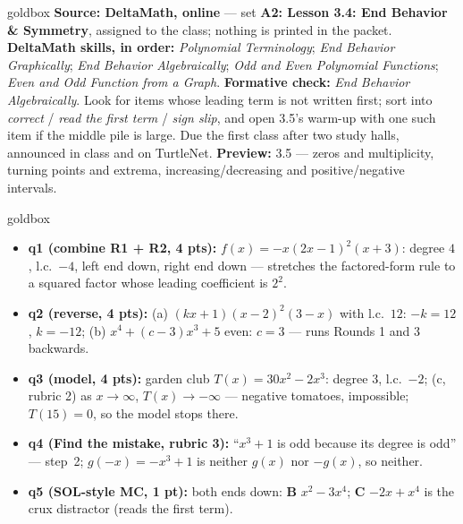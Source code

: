 \documentclass[10pt]{article}
\begin{document}
\boxguard
\begin{skillbox}{goldbox}
\textbf{Source: DeltaMath, online} --- set \textbf{A2: Lesson 3.4: End Behavior \& Symmetry},
assigned to the class; nothing is printed in the packet. \textbf{DeltaMath skills, in order:} \emph{Polynomial Terminology}; \emph{End Behavior Graphically}; \emph{End Behavior Algebraically}; \emph{Odd and Even Polynomial Functions}; \emph{Even and Odd Function from a Graph}. \textbf{Formative check:} \emph{End Behavior Algebraically}. Look for items whose leading term is not written first;
sort into \emph{correct} / \emph{read the first term} / \emph{sign slip}, and open 3.5's warm-up
with one such item if the middle pile is large. Due the first class after two study halls,
announced in class and on TurtleNet. \textbf{Preview:} 3.5 --- zeros and multiplicity, turning
points and extrema, increasing/decreasing and positive/negative intervals.
\end{skillbox}

\boxguard
\begin{skillbox}{goldbox}
\begin{itemize}[leftmargin=1.2em, nosep]
  \item \textbf{q1 (combine R1 + R2, 4 pts):} $f(x)=-x(2x-1)^2(x+3)$: degree $4$, l.c.\ $-4$,
        left end down, right end down --- stretches the factored-form rule to a squared factor
        whose leading coefficient is $2^2$.
  \item \textbf{q2 (reverse, 4 pts):} (a) $(kx+1)(x-2)^2(3-x)$ with l.c.\ $12$: $-k=12$,
        $k=-12$; (b) $x^4+(c-3)x^3+5$ even: $c=3$ --- runs Rounds 1 and 3 backwards.
  \item \textbf{q3 (model, 4 pts):} garden club $T(x)=30x^2-2x^3$: degree $3$, l.c.\ $-2$;
        (c, rubric 2) as $x\to\infty$, $T(x)\to-\infty$ --- negative tomatoes, impossible;
        $T(15)=0$, so the model stops there.
  \item \textbf{q4 (Find the mistake, rubric 3):} ``$x^3+1$ is odd because its degree is odd''
        --- step~2; $g(-x)=-x^3+1$ is neither $g(x)$ nor $-g(x)$, so neither.
  \item \textbf{q5 (SOL-style MC, 1 pt):} both ends down: \textbf{B} $x^2-3x^4$; \textbf{C}
        $-2x+x^4$ is the crux distractor (reads the first term).
\end{itemize}
\end{skillbox}
\end{document}
